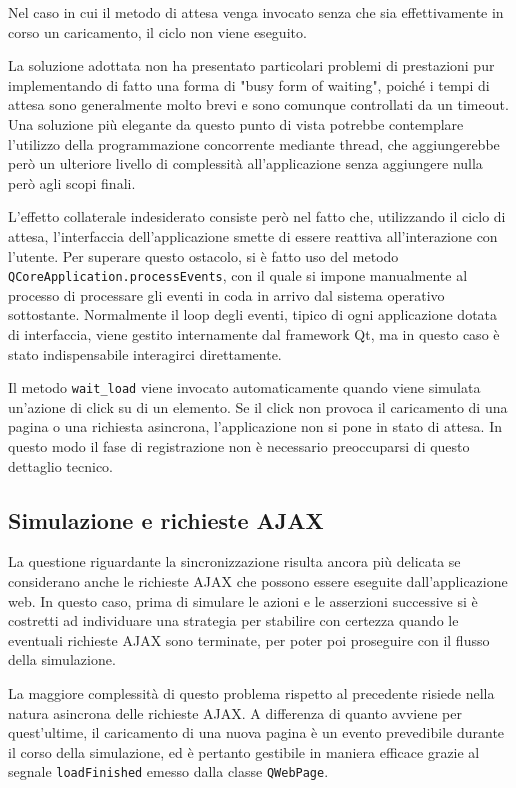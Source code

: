 Nel caso in cui il metodo di attesa venga invocato senza che sia effettivamente in corso un caricamento, il ciclo non viene eseguito.

La soluzione adottata non ha presentato particolari problemi di prestazioni pur implementando di fatto una forma di "busy form of waiting", poiché i tempi di attesa sono generalmente molto brevi e sono comunque controllati da un timeout. Una soluzione più elegante da questo punto di vista potrebbe contemplare l'utilizzo della programmazione concorrente mediante thread, che aggiungerebbe però un ulteriore livello di complessità all'applicazione senza aggiungere nulla però agli scopi finali.

L'effetto collaterale indesiderato consiste però nel fatto che, utilizzando il ciclo di attesa, l'interfaccia dell'applicazione smette di essere reattiva all'interazione con l'utente. Per superare questo ostacolo, si è fatto uso del metodo \verb|QCoreApplication.processEvents|, con il quale si impone manualmente al processo di processare gli eventi in coda in arrivo dal sistema operativo sottostante. Normalmente il loop degli eventi, tipico di ogni applicazione dotata di interfaccia, viene gestito internamente dal framework Qt, ma in questo caso è stato indispensabile interagirci direttamente.

Il metodo \verb|wait_load| viene invocato automaticamente quando viene simulata un'azione di click su di un elemento. Se il click non provoca il caricamento di una pagina o una richiesta asincrona, l'applicazione non si pone in stato di attesa. In questo modo il fase di registrazione non è necessario preoccuparsi di questo dettaglio tecnico.

\subsection{Simulazione e richieste AJAX}

La questione riguardante la sincronizzazione risulta ancora più delicata se considerano anche le richieste AJAX che possono essere eseguite dall'applicazione web. In questo caso, prima di simulare le azioni e le asserzioni successive si è costretti ad individuare una strategia per stabilire con certezza quando le eventuali richieste AJAX sono terminate, per poter poi proseguire con il flusso della simulazione. 

La maggiore complessità di questo problema rispetto al precedente risiede nella natura asincrona delle richieste AJAX. A differenza di quanto avviene per quest'ultime, il caricamento di una nuova pagina è un evento prevedibile durante il corso della simulazione, ed è pertanto gestibile in maniera efficace grazie al segnale \verb|loadFinished| emesso dalla classe \verb|QWebPage|. 

